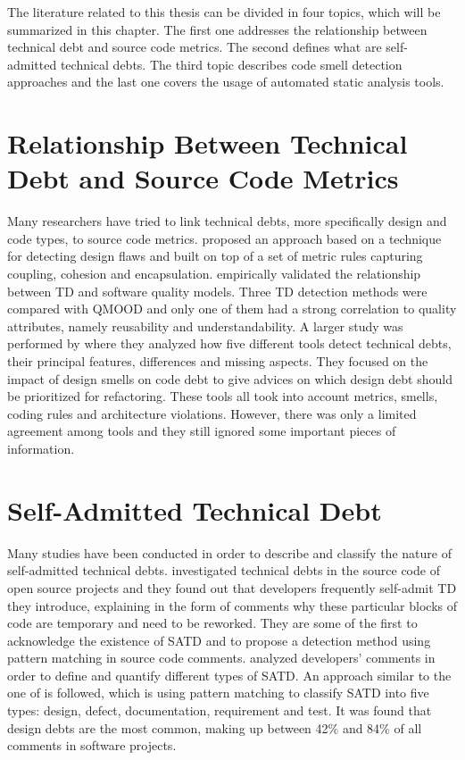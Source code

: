 \label{sec:RevLitt}


\setlength{\parindent}{5ex}The literature related to this thesis can be divided in four topics, which will be summarized in this chapter. The first one addresses the relationship between technical debt and source code metrics. The second defines what are self-admitted technical debts. The third topic describes code smell detection approaches and the last one covers the usage of automated static analysis tools.

\section{Relationship Between Technical Debt and Source Code Metrics}

Many researchers have tried to link technical debts, more specifically design and code types, to source code metrics. \citet{marinescu2012assessing} proposed an approach based on a technique for detecting design flaws and built on top of a set of metric rules capturing coupling, cohesion and encapsulation. \citet{griffith2014correspondence} empirically validated the relationship between \ac{TD} and software quality models. Three \ac{TD} detection methods were compared with \ac{QMOOD} \citep{bansiya2002hierarchical} and only one of them had a strong correlation to quality attributes, namely reusability and understandability. A larger study was performed by \citet{fontana2016technical} where they analyzed how five different tools detect technical debts, their principal features, differences and missing aspects. They focused on the impact of design smells on code debt to give advices on which design debt should be prioritized for refactoring. These tools all took into account metrics, smells, coding rules and architecture violations. However, there was only a limited agreement among tools and they still ignored some important pieces of information.

\section{Self-Admitted Technical Debt}

Many studies have been conducted in order to describe and classify the nature of self-admitted technical debts. \citet{PotdarS14} investigated technical debts in the source code of open source projects and they found out that developers frequently self-admit \ac{TD} they introduce, explaining in the form of comments why these particular blocks of code are temporary and need to be reworked. They are some of the first to acknowledge the existence of \ac{SATD} and to propose a detection method using pattern matching in source code comments. \citet{MaldonadoS15} analyzed developers' comments in order to define and quantify different types of \ac{SATD}. An approach similar to the one of \citet{PotdarS14} is followed, which is using pattern matching to classify \ac{SATD} into five types: design, defect, documentation, requirement and test. It was found that design debts are the most common, making up between 42\% and 84\% of all comments in software projects. \par


